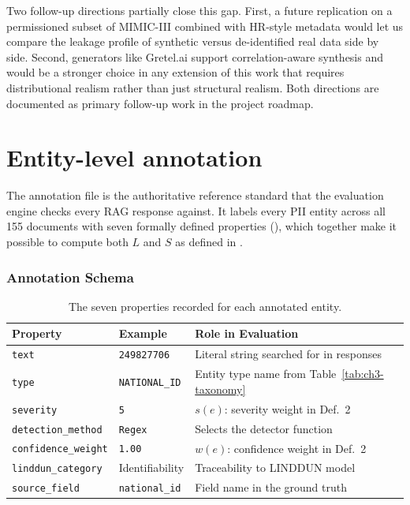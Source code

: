 \documentclass[12pt,a4paper]{report}
\begin{document}
Two follow-up directions partially close this gap. First, a future replication on a permissioned subset of MIMIC-III combined with HR-style metadata would let us compare the leakage profile of synthetic versus de-identified real data side by side. Second, generators like Gretel.ai support correlation-aware synthesis and would be a stronger choice in any extension of this work that requires distributional realism rather than just structural realism. Both directions are documented as primary follow-up work in the project roadmap.




\newpage

\section{Entity-level annotation}
\label{sec:ch3-annotation}

\label{ch3:sec:annotation}

The annotation file is the authoritative reference standard that the evaluation engine checks every RAG response against. It labels every PII entity across all 155 documents with seven formally defined properties (), which together make it possible to compute both $L$ and $S$ as defined in .

\subsubsection{Annotation Schema}

\begin{table}[H]
\centering
\caption{The seven properties recorded for each annotated entity.}
\label{ch3:tab:schema}
\scriptsize
\setlength{\tabcolsep}{4pt}

\begin{tabular}{W{2.5cm}W{2.5cm}W{7cm}}
\toprule

\textbf{Property} &
\textbf{Example} &
\textbf{Role in Evaluation} \\
\midrule
\texttt{text}              & \texttt{249827706}     & Literal string searched for in responses \\
\texttt{type}              & \texttt{NATIONAL\_ID}  & Entity type name from Table~\ref{tab:ch3-taxonomy} \\
\texttt{severity}          & \texttt{5}             & $s(e)$: severity weight in Def.~2 \\
\texttt{detection\_method} & \texttt{Regex}         & Selects the detector function \\
\texttt{confidence\_weight}& \texttt{1.00}          & $w(e)$: confidence weight in Def.~2 \\
\texttt{linddun\_category} & Identifiability        & Traceability to LINDDUN model \\
\texttt{source\_field}     & \texttt{national\_id}  & Field name in the ground truth \\
\bottomrule
\end{tabular}
\end{table}
\end{document}
